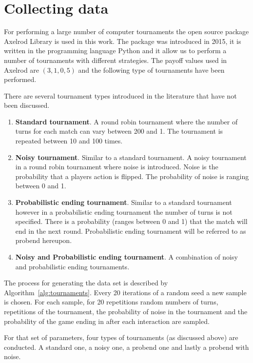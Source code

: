 \documentclass{article}
\begin{document}
\section{Collecting data}

For performing a large number of computer tournaments the open source package
Axelrod Library is used in this work. The package was introduced in 2015,
it is written in the programming language Python and it allow us to perform
a number of tournaments with different strategies. The payoff values used in
Axelrod are \((3, 1, 0, 5)\) and the following type of tournaments have been performed.

There are several tournament types introduced in the literature that have not been
discussed.

\begin{enumerate}
    \item \textbf{Standard tournament}. A round robin tournament where
    the number of turns for each match can vary between 200 and 1. The tournament
    is repeated between 10 and 100 times.
    \item \textbf{Noisy tournament}. Similar to a standard tournament. A noisy
    tournament in a round robin tournament where noise is introduced. Noise is the
    probability that a players action is flipped. The probability of noise is
    ranging between 0 and 1.
    \item \textbf{Probabilistic ending tournament}. Similar to a standard tournament
    however in a probabilistic ending tournament the number of turns is not specified.
    There is a probability (ranges between 0 and 1) that the match will end in
    the next round. Probabilistic ending tournament will be referred to as
    probend hereupon.
    \item \textbf{Noisy and Probabilistic ending tournament}. A combination of
    noisy and probabilistic ending tournaments.
\end{enumerate}

The process for generating the data set is described by Algorithm~\ref{alg:tournaments}.
Every 20 iterations of a random seed a new sample is chosen. For each sample, for 20
repetitions random numbers of turns, repetitions of the tournament, the probability of
noise in the tournament and the probability of the game ending in after each interaction
are sampled.

For that set of parameters, four types of tournaments (as discussed above) are conducted.
A standard one, a noisy one, a probend one and lastly a probend with noise.
\end{document}
